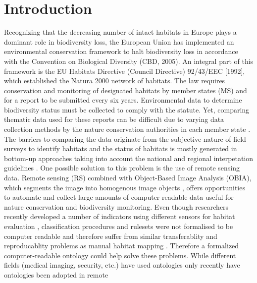 \documentclass[authoryear, review,12pt,number]{elsarticle}
\begin{document}
\section{Introduction}  %
Recognizing that the decreasing number of
intact habitats in Europe  plays a dominant role in biodiversity loss, the
European Union has implemented an environmental conservation framework to halt
biodiversity loss in accordance with the Convention on Biological Diversity
(CBD, 2005). An integral part of this framework is the EU Habitats Directive
(Council Directive) 92/43/EEC [1992], which established the Natura 2000 network
of habitats. The law requires conservation and monitoring of designated habitats
by member states (MS) and for a report to be submitted every six years.
Environmental data to determine biodiversity status must be collected to comply
with the statute. Yet, comparing thematic data used for these reports can be
difficult due to varying data collection methods by the nature conservation
authorities in each member state \citep{INSPIREdataspecs, INSPIRE}. The barriers
to comparing the data originate from the subjective nature of field surveys to
identify habitats \citep{Cherrill1999, Cherrill1999a, Nieland2015, Nieland2016}
and the status of habitats is mostly generated in bottom-up approaches taking
into account the national and regional interpetation guidelines
\citep{INSPIREdataspecs}. One possible solution to this problem is the use of
remote sensing data. Remote sensing (RS) combined with Object-Based Image
Analysis (OBIA), which segments the image into homogenous image objects
\citep{Blaschke2010}, offers opportunities to automate and collect large amounts
of computer-readable data useful for nature conservation \citep{Corbane2015,
VandenBorre2011, Mayer2011} and biodiversity monitoring. Even though researchers
recently developed a number of indicators using different sensors for habitat
evaluation \citep{Nagendra2013}, classification procedures and rulesets were not
formalised to be computer readable and therefore suffer from similar
transferablity and reproducablity problems as manual habitat mapping
\citep{Arvor2013} \citep{Nieland2015}. Therefore a formalized computer-readable
ontology could help solve these problems.
While different fields (medical imaging, security,
etc.) have used ontologies only recently have ontologies been adopted in remote
\end{document}
